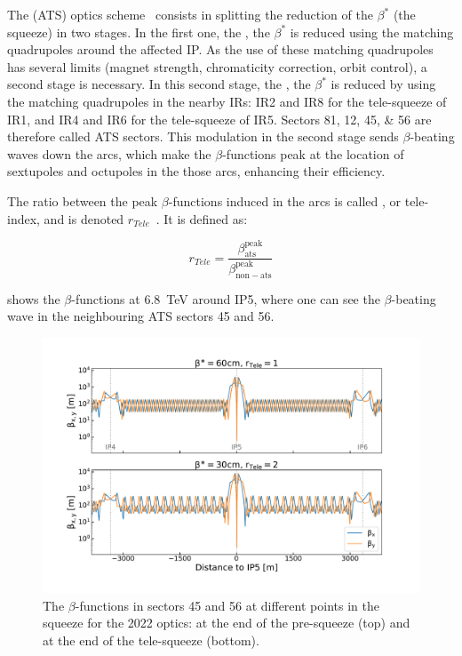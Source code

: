 The  (ATS) optics scheme~\cite{CERN:Fartoukh:ATS_Report,PRAB:Fartoukh:Achromatic_Telescopic_Squeeze,IPAC:Pojer:LHC_ATS_Experience} consists in splitting the reduction of the \(\beta^{\ast}\) (the squeeze) in two stages.
In the first one, the , the \(\beta^{\ast}\) is reduced using the matching quadrupoles around the affected IP.
As the use of these matching quadrupoles has several limits (magnet strength, chromaticity correction, orbit control), a second stage is necessary.
In this second stage, the , the \(\beta^{\ast}\) is reduced by using the matching quadrupoles in the nearby IRs: IR\num{2} and IR\num{8} for the tele-squeeze of IR\num{1}, and IR\num{4} and IR\num{6} for the tele-squeeze of IR\num{5}.
Sectors \numlist{81;12;45;56} are therefore called ATS sectors.
This modulation in the second stage sends \(\beta\)-beating waves down the arcs, which make the \(\beta\)-functions peak at the location of sextupoles and octupoles in the those arcs, enhancing their efficiency.

The ratio between the peak \(\beta\)-functions induced in the arcs is called , or tele-index, and is denoted \(r_{Tele}\)~\cite{CERN:Fartoukh:Round_Telescopic_Optics_LHC_Large_Telescopic_Index}.
It is defined as:

\begin{equation}
  r_{Tele} = \frac{\beta^{\mathrm{peak}}_{\mathrm{ats}}}{\beta^{\mathrm{peak}}_{\mathrm{non-ats}}}
  \label{equation:tele_index}
\end{equation}

 shows the \(\beta\)-functions at \qty{6.8}{\tera\electronvolt} around IP\num{5}, where one can see the \(\beta\)-beating wave in the neighbouring ATS sectors \num{45} and \num{56}.

\begin{figure}[!hbt]
  \centering
  \includegraphics*[width=0.99\linewidth]{Figures/Optics_Measurements_Corrections_at_LHC/lhc_ats_wave.pdf}
  \caption{The \(\beta\)-functions in sectors \num{45} and \num{56} at different points in the squeeze for the \num{2022} optics: at the end of the pre-squeeze (top) and at the end of the tele-squeeze (bottom).}
  \label{figure:lhc_ats_scheme}
\end{figure}

